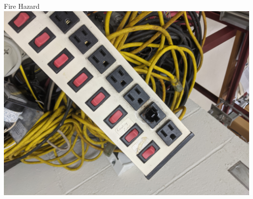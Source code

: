 \documentclass{presentation}
\begin{document}
\begin{frame}{Fire Hazard}
  \includegraphics[width=\textwidth]{"./PXL_20201216_221308084.jpg"}
\end{frame}
\end{document}
